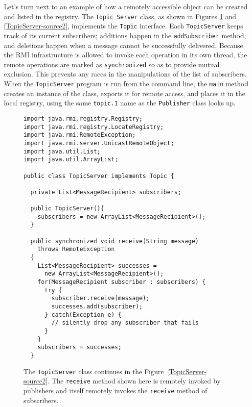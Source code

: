 Let's turn next to an example of how a remotely accessible object can
be created and listed in the registry.  The {\tt Topic Server} class,
as shown in Figures \ref{TopicServer-source1} and \ref{TopicServer-source2}, implements the {\tt Topic}
interface.  Each {\tt TopicServer} keeps track of its current
subscribers; additions happen in the {\tt addSubscriber} method, and
deletions happen when a message cannot be successfully delivered.
Because the RMI infrastructure is allowed to invoke each operation in its own
thread, the remote operations
are marked as {\tt synchronized} so as to provide mutual exclusion.
This prevents any races in the manipulations of the list of subscribers.
When the {\tt TopicServer} program is run from the command line, the
{\tt main} method creates an instance of the class, exports it for
remote access, and places it in the local registry, using the same
{\tt topic.1} name as the {\tt Publisher} class looks up.
\begin{figure}
\begin{verbatim}
import java.rmi.registry.Registry;
import java.rmi.registry.LocateRegistry;
import java.rmi.RemoteException;
import java.rmi.server.UnicastRemoteObject;
import java.util.List;
import java.util.ArrayList;

public class TopicServer implements Topic {

  private List<MessageRecipient> subscribers;

  public TopicServer(){
    subscribers = new ArrayList<MessageRecipient>();
  }

  public synchronized void receive(String message)
    throws RemoteException
  {
    List<MessageRecipient> successes =
      new ArrayList<MessageRecipient>();
    for(MessageRecipient subscriber : subscribers) {
      try {
        subscriber.receive(message);
        successes.add(subscriber);
      } catch(Exception e) {
        // silently drop any subscriber that fails
      }
    }
    subscribers = successes;
  }
\end{verbatim}
\caption{The {\tt TopicServer} class continues in the Figure~\ref{TopicServer-source2}.
  The {\tt receive} method shown here is remotely invoked
  by publishers and itself remotely invokes the {\tt receive} method
  of subscribers.}\label{TopicServer-source1}
\end{figure}
